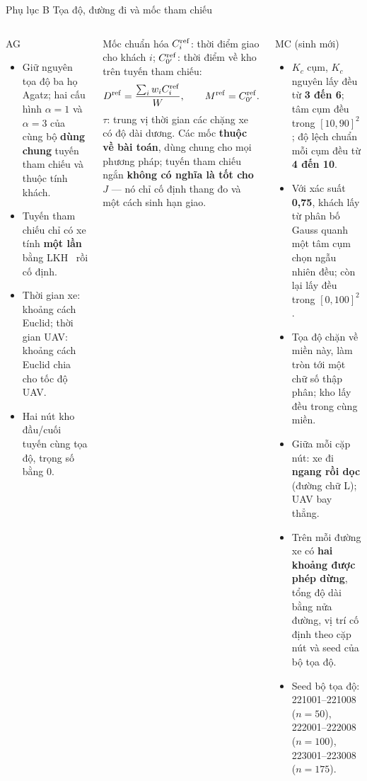 \documentclass[aspectratio=169,10pt,t,xcolor={table}]{beamer}
\newcommand{\Dref}{D^{\mathrm{ref}}}
\newcommand{\Mref}{M^{\mathrm{ref}}}
\newcommand{\apptitle}[2]{Phụ lục #1 \textperiodcentered{} #2}
\begin{document}
\begin{frame}{\apptitle{B}{Tọa độ, đường đi và mốc tham chiếu}}
\begin{columns}[T,onlytextwidth]
\begin{block}{AG}
\scriptsize
\begin{itemize}
\item Giữ nguyên tọa độ ba họ Agatz; hai cấu hình $\alpha=1$ và $\alpha=3$ của cùng bộ \textbf{dùng chung} tuyến tham chiếu và thuộc tính khách.
\item Tuyến tham chiếu chỉ có xe tính \textbf{một lần} bằng LKH~\cite{lkh2000} rồi cố định.
\item Thời gian xe: khoảng cách Euclid; thời gian UAV: khoảng cách Euclid chia cho tốc độ UAV.
\item Hai nút kho đầu/cuối tuyến cùng tọa độ, trọng số bằng 0.
\end{itemize}
\end{block}
\begin{block}{Mốc chuẩn hóa}
\scriptsize
$C_i^{\rm ref}$: thời điểm giao cho khách $i$; $C_{0'}^{\rm ref}$: thời điểm về kho trên tuyến tham chiếu:
\[
\Dref=\frac{\sum_iw_iC_i^{\rm ref}}{W},\qquad \Mref=C_{0'}^{\rm ref}.
\]
$\tau$: trung vị thời gian các chặng xe có độ dài dương. Các mốc \textbf{thuộc về bài toán}, dùng chung cho mọi phương pháp; tuyến tham chiếu ngắn \textbf{không có nghĩa là tốt cho $J$} --- nó chỉ cố định thang đo và một cách sinh hạn giao.
\end{block}
\begin{block}{MC (sinh mới)}
\scriptsize
\begin{itemize}
\item $K_c$ cụm, $K_c$ nguyên lấy đều từ \textbf{3 đến 6}; tâm cụm đều trong $[10,90]^2$; độ lệch chuẩn mỗi cụm đều từ \textbf{4 đến 10}.
\item Với xác suất \textbf{0,75}, khách lấy từ phân bố Gauss quanh một tâm cụm chọn ngẫu nhiên đều; còn lại lấy đều trong $[0,100]^2$.
\item Tọa độ chặn về miền này, làm tròn tới một chữ số thập phân; kho lấy đều trong cùng miền.
\item Giữa mỗi cặp nút: xe đi \textbf{ngang rồi dọc} (đường chữ L); UAV bay thẳng.
\item Trên mỗi đường xe có \textbf{hai khoảng được phép dừng}, tổng độ dài bằng nửa đường, vị trí cố định theo cặp nút và seed của bộ tọa độ.
\item Seed bộ tọa độ: 221001--221008 ($n=50$), 222001--222008 ($n=100$), 223001--223008 ($n=175$).
\end{itemize}
\end{block}
\end{columns}
\end{frame}
\end{document}
